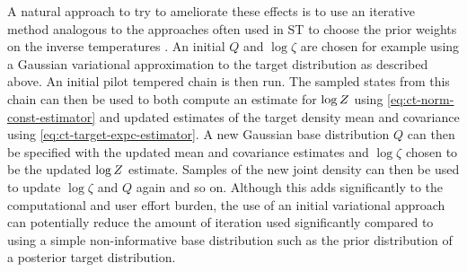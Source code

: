 
A natural approach to try to ameliorate these effects is to use an iterative method analogous to the approaches often used in \ac{ST} to choose the prior weights on the inverse temperatures \citep{geyer1995annealing,carlson2016partition}. An initial $Q$ and $\log \zeta$ are chosen for example using a Gaussian variational approximation to the target distribution as described above. An initial pilot tempered chain is then run. The sampled states from this chain can then be used to both compute an estimate for $\log Z$ using \eqref{eq:ct-norm-const-estimator} and updated estimates of the target density mean and covariance using \eqref{eq:ct-target-expc-estimator}. A new Gaussian base distribution $Q$ can then be specified with the updated mean and covariance estimates and $\log \zeta$ chosen to be the updated $\log Z$ estimate. Samples of the new joint density can then be used to update $\log \zeta$ and $Q$ again and so on. Although this adds significantly to the computational and user effort burden, the use of an initial variational approach can potentially reduce the amount of iteration used significantly compared to using a simple non-informative base distribution such as the prior distribution of a posterior target distribution.


